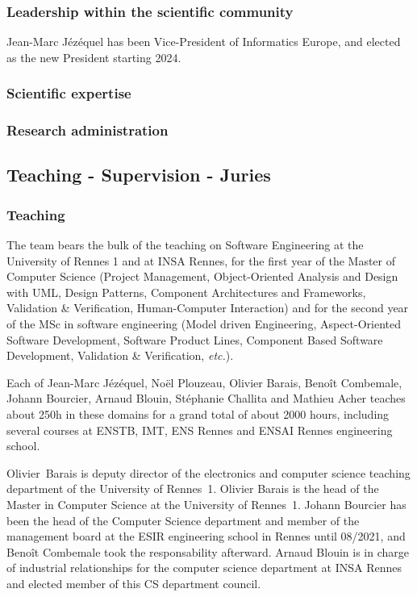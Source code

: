 \subsubsection{Leadership within the scientific community}
\label{DIVERSE:animation-leadership}
Jean-Marc Jézéquel has been Vice-President of Informatics Europe, and elected as the new President starting 2024.


\subsubsection{Scientific expertise}
\label{DIVERSE:animation-expertise}

\subsubsection{Research administration}
\label{DIVERSE:animation-admin}

\subsection{Teaching - Supervision - Juries}
\label{DIVERSE:teaching}
\subsubsection {Teaching}

 The \team{} team bears the bulk of the teaching on Software Engineering at the 
 University of Rennes 1 and at INSA Rennes, for the first year of the Master of Computer Science
 (Project Management, Object-Oriented Analysis and Design with UML, Design Patterns, 
 Component Architectures and Frameworks, Validation \& Verification, Human-Computer Interaction) 
 and for the second year of the MSc in software engineering (Model driven Engineering, Aspect-Oriented Software Development, 
 Software Product Lines, Component Based Software Development, Validation \& Verification, \textit{etc.}). 
 
 Each of Jean-Marc J\'{e}z\'{e}quel, No\"el Plouzeau, Olivier Barais, Benoît Combemale, Johann Bourcier, Arnaud Blouin, Stéphanie Challita and Mathieu Acher teaches about 250h in these domains for a grand total of about 2000 hours, including several courses at ENSTB, IMT, ENS Rennes and ENSAI Rennes engineering school.
 
Olivier~Barais is deputy director of the electronics and computer science teaching department of the University of Rennes~1.
Olivier Barais is the head of the Master in Computer Science at the University of Rennes~1.
Johann Bourcier has been the head of the Computer Science department and member of the management board at the ESIR engineering school in Rennes until 08/2021, and Benoît Combemale took the responsability afterward.
Arnaud Blouin is in charge of industrial relationships for the computer science department at INSA Rennes and elected member of this CS department council.
 

